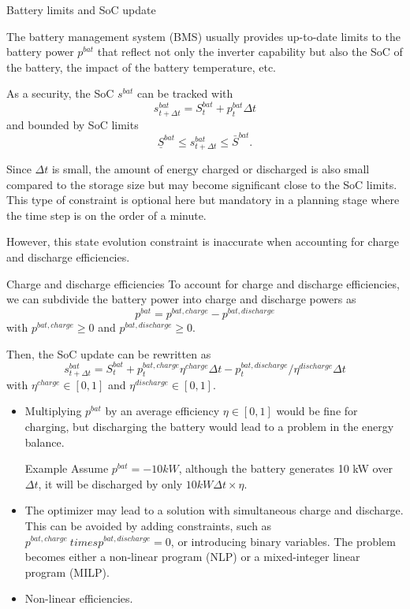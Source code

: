 \begin{frame}[allowframebreaks]{Battery limits and SoC update}

    The battery management system (BMS) usually provides up-to-date limits to the battery power $p^{bat}$ that reflect not only the inverter capability but also the SoC of the battery, the impact of the battery temperature, etc.
    
    As a security, the SoC $s^{bat}$ can be tracked with 
    $$s^{bat}_{t+\Delta t} = S^{bat}_{t} + p^{bat}_t  \Delta t$$
    and bounded by SoC limits
    $$ \underline{S}^{bat} \leq s^{bat}_{t+\Delta t} \leq \bar{S}^{bat}.$$

    Since $\Delta t$ is small, the amount of energy charged or discharged is also small compared to the storage size but may become significant close to the SoC limits.
    This type of constraint is optional here but mandatory in a planning stage where the time step is on the order of a minute.

    However, this state evolution constraint is inaccurate when accounting for charge and discharge efficiencies.
\end{frame}

\begin{frame}[allowframebreaks]{Charge and discharge efficiencies}
    To account for charge and discharge efficiencies, we can subdivide the battery power into charge and discharge powers as 
    $$ p^{bat} = p^{bat, charge} - p^{bat, discharge}$$
    with $p^{bat, charge} \geq 0$ and $p^{bat, discharge} \geq 0$.

    Then, the SoC update can be rewritten as
    $$s^{bat}_{t+\Delta t} = S^{bat}_{t} + p^{bat, charge}_t  \eta^{charge} \Delta t - p^{bat, discharge}_t / \eta^{discharge} \Delta t $$
    with $\eta^{charge} \in [0,1]$ and $\eta^{discharge} \in [0,1]$.

    \begin{itemize}
        \item Multiplying $p^{bat}$ by an average efficiency $\eta \in [0,1]$ would be fine for charging, but discharging the battery would lead to a problem in the energy balance.
        \begin{block}{Example}
            Assume $p^{bat} = -10 kW$, although the battery generates 10 kW over $\Delta t$, it will be discharged by only $10 kW \Delta t \times \eta$.    
        \end{block}
        \item The optimizer may lead to a solution with simultaneous charge and discharge. 
        This can be avoided by adding constraints, such as $p^{bat, charge}\ times p^{bat, discharge} = 0$, or introducing binary variables. The problem becomes either a non-linear program (NLP) or a mixed-integer linear program (MILP).
        \item Non-linear efficiencies.
    \end{itemize}
\end{frame}


